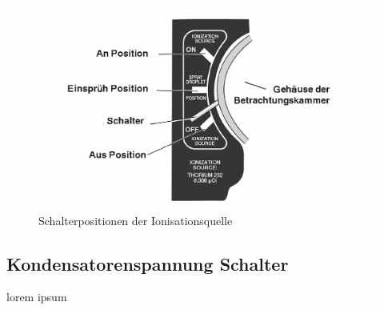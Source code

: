 \begin{figure}[ht]
	\begin{center}
		\includegraphics[scale=0.5]{bilder/pdf/Schalterfunktionen.pdf}
		\caption{Schalterpositionen der Ionisationsquelle}
		\label{fig:Schalterpositionen}
	\end{center}
\end{figure}

\subsection{Kondensatorenspannung Schalter}\label{sub:Spannungsschalter}
lorem ipsum